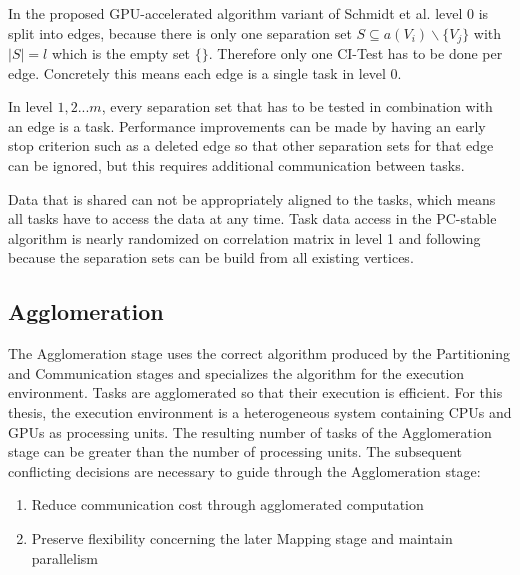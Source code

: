 In the proposed GPU-accelerated algorithm variant of Schmidt et al. \cite{schmidtOrderIndependentConstraintBasedCausal2018} level 0 is split into edges, because there is only one separation set $S \subseteq a(V_i ) \backslash \{V_j\}$ with $| S | = l$ which is the empty set $\{\}$. Therefore only one CI-Test has to be done per edge. Concretely this means each edge is a single task in level 0.

In level $1,2 ... m$, every separation set that has to be tested in combination with an edge is a task. Performance improvements can be made by having an early stop criterion such as a deleted edge so that other separation sets for that edge can be ignored, but this requires additional communication between tasks.

Data that is shared can not be appropriately aligned to the tasks, which means all tasks have to access the data at any time. Task data access in the PC-stable algorithm is nearly randomized on correlation matrix in level 1 and following because the separation sets can be build from all existing vertices. 

    
\subsection{Agglomeration}
\label{chap:agglo}
The Agglomeration stage uses the correct algorithm produced by the Partitioning and Communication stages and specializes the algorithm for the execution environment. Tasks are agglomerated so that their execution is efficient. For this thesis, the execution environment is a heterogeneous system containing CPUs and GPUs as processing units. The resulting number of tasks of the Agglomeration stage can be greater than the number of processing units. The subsequent conflicting decisions are necessary to guide through the Agglomeration stage:

\begin{enumerate}
    \item Reduce communication cost through agglomerated computation
    \item Preserve flexibility concerning the later Mapping stage and maintain parallelism
\end{enumerate}

